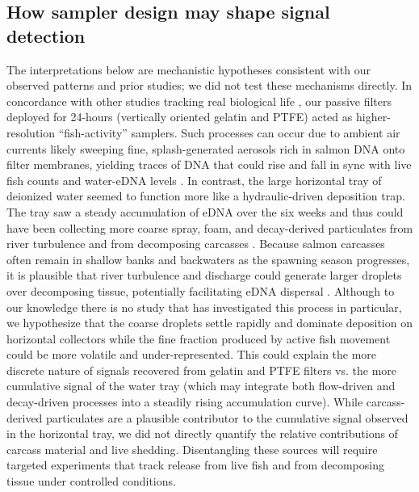 \documentclass{article}
\begin{document}
\subsection{How sampler design may shape signal detection}
The interpretations below are mechanistic hypotheses consistent with our observed patterns and prior studies; we did not test these mechanisms directly. In concordance with other studies tracking real biological life \cite{jager2025}, our passive filters deployed for 24-hours (vertically oriented gelatin and PTFE) acted as higher-resolution “fish-activity” samplers. Such processes can occur due to ambient air currents likely sweeping fine, splash-generated aerosols rich in salmon DNA onto filter membranes, yielding traces of DNA that could rise and fall in sync with live fish counts and water-eDNA levels \cite{blanchard1980}. In contrast, the large horizontal tray of deionized water seemed to function more like a hydraulic-driven deposition trap. The tray saw a steady accumulation of eDNA over the six weeks and thus could have been collecting more coarse spray, foam, and decay-derived particulates from river turbulence and from decomposing carcasses \cite{hinds2022, prather2013}. Because salmon carcasses often remain in shallow banks and backwaters as the spawning season progresses, it is plausible that river turbulence and discharge could generate larger droplets over decomposing tissue, potentially facilitating eDNA dispersal \cite{wood2021, herman2023}. Although to our knowledge there is no study that has investigated this process in particular, we hypothesize that the coarse droplets settle rapidly and dominate deposition on horizontal collectors while the fine fraction produced by active fish movement could be more volatile and under-represented. This could explain the more discrete nature of signals recovered from gelatin and PTFE filters vs. the more cumulative signal of the water tray (which may integrate both flow-driven and decay-driven processes into a steadily rising accumulation curve). While carcass-derived particulates are a plausible contributor to the cumulative signal observed in the horizontal tray, we did not directly quantify the relative contributions of carcass material and live shedding. Disentangling these sources will require targeted experiments that track release from live fish and from decomposing tissue under controlled conditions.
\end{document}
